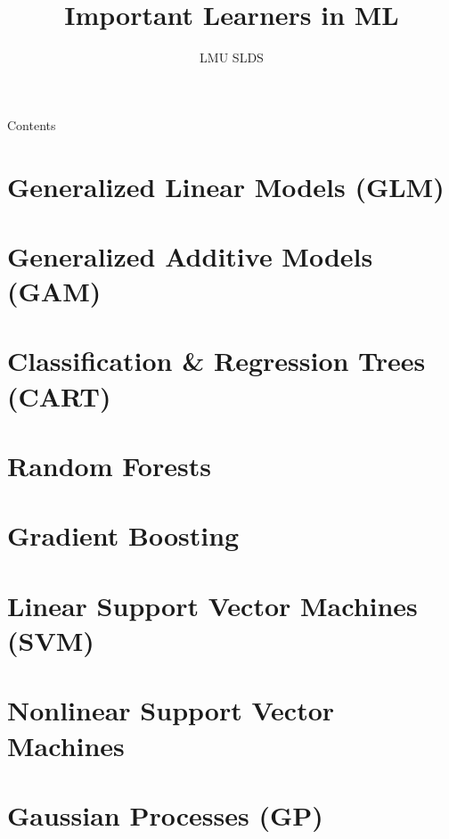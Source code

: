 \documentclass[11pt, t, aspectratio=169]{beamer}
\title{Important Learners in ML}
\institute{\href{https://compstat-lmu.github.io/lecture_i2ml/}{
compstat-lmu.github.io/lecture\_i2ml}}
\author{LMU SLDS}
\date{}
\begin{document}
\lecturechapter{}

\begin{frame}{Contents}
  \tableofcontents
\end{frame}

\footnotesize


%

\section{Generalized Linear Models (GLM)}


% 

\section{Generalized Additive Models (GAM)}


\section{Classification \& Regression Trees (CART)}


\section{Random Forests}


\section{Gradient Boosting}


\section{Linear Support Vector Machines (SVM)}


\section{Nonlinear Support Vector Machines}


\section{Gaussian Processes (GP)}


%

\endlecture
\end{document}
